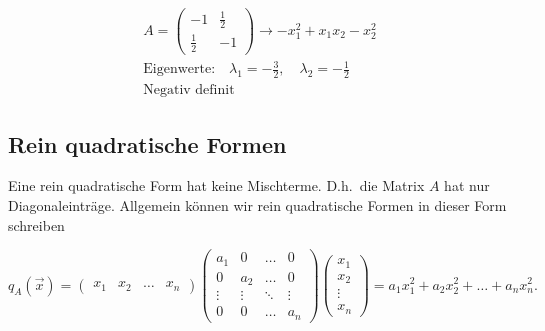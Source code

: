 \begin{figure}[h]
    \centering
    \begin{minipage}{0.39\textwidth}
        \centering
    \end{minipage}
    \hfill
    \begin{minipage}{0.6\textwidth}
        \begin{equation*}
            \begin{aligned}
                A = \begin{pmatrix} -1 & \frac{1}{2} \\ \frac{1}{2} & -1 \end{pmatrix} \rightarrow -x_1^2 + x_1x_2 - x_2^2 \\[0.5em]
                \text{Eigenwerte:} \quad \lambda_1 = - \frac{3}{2}, \quad \lambda_2 = - \frac{1}{2} \\[0.5em]
                \text{Negativ definit} \qquad \qquad
            \end{aligned}
        \end{equation*}
    \end{minipage}
\end{figure}

\subsection{Rein quadratische Formen}

Eine rein quadratische Form hat keine Mischterme. D.h.\ die Matrix \( A \)  hat nur Diagonaleinträge. Allgemein können wir rein quadratische Formen in dieser Form schreiben

\begin{equation*}
    q_A(\vec{x}) = \begin{pmatrix} x_1 & x_2 & \dots & x_n \end{pmatrix} \begin{pmatrix} a_1 & 0 & \dots & 0 \\ 0 & a_2 & \dots & 0 \\ \vdots & \vdots & \ddots & \vdots \\ 0 & 0 & \dots & a_n \end{pmatrix} \begin{pmatrix} x_1 \\ x_2 \\ \vdots \\ x_n \end{pmatrix} = a_1x_1^2 + a_2x_2^2 + \dots + a_nx_n^2.
\end{equation*}

